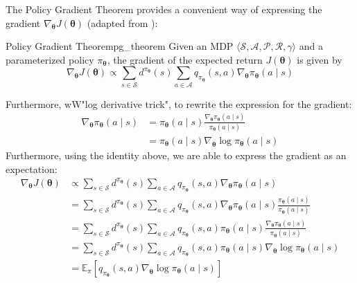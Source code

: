 The Policy Gradient Theorem provides a convenient way of expressing the gradient $\nabla_{\boldsymbol\theta} J(\boldsymbol\theta)$ (adapted from \cite{NIPS1999_464d828b}):
\begin{theorem}{Policy Gradient Theorem}{pg_theorem}
    Given an MDP $\langle \mathcal{S}, \mathcal{A}, \mathcal{P}, \mathcal{R}, \gamma \rangle$ and a parameterized policy $\pi_{\boldsymbol\theta}$, the gradient of the expected return $J(\boldsymbol\theta)$ is given by
    \begin{equation}
        \nabla_{\boldsymbol\theta} J(\boldsymbol\theta) \propto \sum_{s \in \mathcal{S}} d^{\pi_{\boldsymbol\theta}}(s) \sum_{a \in \mathcal{A}} q_{\pi_{\boldsymbol\theta}}(s, a) \nabla_{\boldsymbol\theta}\pi_{\boldsymbol\theta}(a \mid s)
    \end{equation}
\end{theorem}
Furthermore, wW"log derivative trick", to rewrite the expression for the gradient:
\begin{align*}
    \nabla_{\boldsymbol\theta}\pi_{\boldsymbol\theta}(a \mid s) &= \pi_{\boldsymbol\theta}(a \mid s)\frac{\nabla_{\boldsymbol\theta}\pi_{\boldsymbol\theta}(a \mid s)}{\pi_{\boldsymbol\theta}(a \mid s)} \\ 
     &= \pi_{\boldsymbol\theta}(a \mid s)\nabla_{\boldsymbol\theta}\log{\pi_{\boldsymbol\theta}(a \mid s)}
\end{align*}
Furthermore, using the identity above, we are able to express the gradient as an expectation:
\begin{align}
    \nabla_{\boldsymbol\theta} J(\boldsymbol\theta) &\propto \sum_{s \in \mathcal{S}} d^{\pi_{\boldsymbol\theta}}(s) \sum_{a \in \mathcal{A}} q_{\pi_{\boldsymbol\theta}}(s, a) \nabla_{\boldsymbol\theta}\pi_{\boldsymbol\theta}(a \mid s)\\
    &= \sum_{s \in \mathcal{S}} d^{\pi_{\boldsymbol\theta}}(s) \sum_{a \in \mathcal{A}} q_{\pi_{\boldsymbol\theta}}(s, a) \nabla_{\boldsymbol\theta}\pi_{\boldsymbol\theta}(a \mid s)\frac{\pi_{\boldsymbol\theta}(a \mid s)}{\pi_{\boldsymbol\theta}(a \mid s)}\nonumber\\
    &= \sum_{s \in \mathcal{S}} d^{\pi_{\boldsymbol\theta}}(s) \sum_{a \in \mathcal{A}} q_{\pi_{\boldsymbol\theta}}(s, a) \pi_{\boldsymbol\theta}(a \mid s)\frac{\nabla_{\boldsymbol\theta}\pi_{\boldsymbol\theta}(a \mid s)}{\pi_{\boldsymbol\theta}(a \mid s)}\nonumber\\
    &= \sum_{s \in \mathcal{S}} d^{\pi_{\boldsymbol\theta}}(s) \sum_{a \in \mathcal{A}} q_{\pi_{\boldsymbol\theta}}(s, a) \pi_{\boldsymbol\theta}(a \mid s)\nabla_{\boldsymbol\theta}\log{\pi_{\boldsymbol\theta}(a \mid s)}\nonumber\\
    &= \mathbb{E}_\pi[q_{\pi_{\boldsymbol\theta}}(s, a)\nabla_{\boldsymbol\theta}\log{\pi_{\boldsymbol\theta}(a \mid s)}] \label{eq:grad-log-prob}
\end{align}
